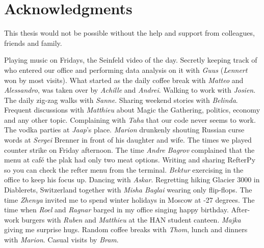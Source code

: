 \manualmark
{}%
%
%
\chapter*{Acknowledgments}%

This thesis would not be possible without the help and support from colleagues, friends and family. 

Playing music on Fridays, the Seinfeld video of the day. Secretly keeping track of who entered our office and performing data analysis on it with \emph{Guus} (\emph{Lennert} won by most visits). What started as the daily coffee break with \emph{Matteo} and \emph{Alessandro}, was taken over by \emph{Achille} and \emph{Andrei}. Walking to work with \emph{Josien}. The daily zig-zag walks with \emph{Sanne}. Sharing weekend stories with \emph{Belinda}. Frequent discussions with \emph{Matthieu} about Magic the Gathering, politics, economy and any other topic. Complaining with \emph{Taha} that our code never seems to work.
The vodka parties at \emph{Jaap}'s place. \emph{Marion} drunkenly shouting Russian curse words at \emph{Sergei} Brenner in front of his daughter and wife. The times we played counter strike on Friday afternoon. The time \emph{Andre Bagrov} complained that the menu at caf\'e the plak had only two meat options. 
Writing and sharing RefterPy so you can check the refter menu from the terminal. \emph{Bektur} exercising in the office to keep his focus up. Dancing with \emph{Askar}. Regretting hiking Glacier 3000 in Diablerets, Switzerland together with \emph{Misha Baglai} wearing only flip-flops. The time \emph{Zhenya} invited me to spend winter holidays in Moscow at -27 degrees. The time when \emph{Roel} and \emph{Ragnar} barged in my office singing happy birthday. After-work burgers with \emph{Ruben} and \emph{Matthieu} at the HAN student canteen. \emph{Majka} giving me surprise hugs. Random coffee breaks with \emph{Thom}, lunch and dinners with \emph{Marion}. Casual visits by \emph{Bram}. %
